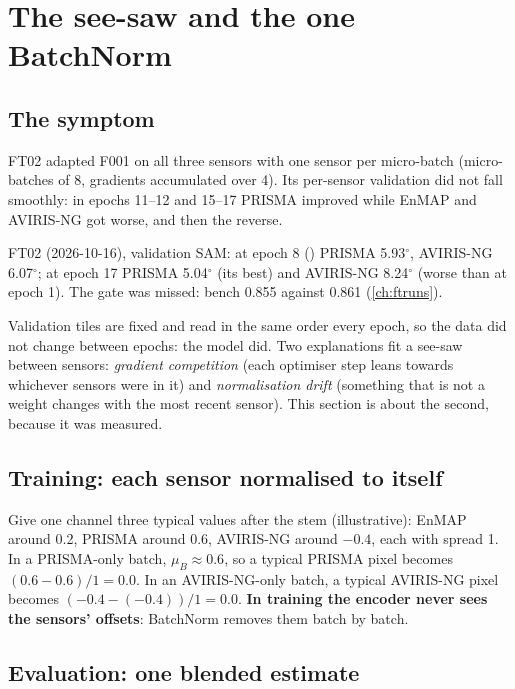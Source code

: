 \section{The see-saw and the one BatchNorm}\label{sec:finetune:seesaw}

\subsection{The symptom}

FT02 adapted F001 on all three sensors with one sensor per micro-batch (micro-batches of 8, gradients accumulated over 4). Its per-sensor validation did
not fall smoothly: in epochs 11--12 and 15--17 PRISMA improved while EnMAP and AVIRIS-NG got worse, and then the reverse.

\begin{drift}
FT02 (2026-10-16), validation SAM: at epoch 8 () PRISMA 5.93$^\circ$, AVIRIS-NG 6.07$^\circ$; at epoch 17 PRISMA 5.04$^\circ$ (its best) and
AVIRIS-NG 8.24$^\circ$ (worse than at epoch 1).\tbrk{} The gate was missed: bench 0.855
against 0.861 (\cref{ch:ftruns}).
\end{drift}

Validation tiles are fixed and read in the same order every epoch, so the data did not change between epochs: the model did. Two explanations fit a
see-saw between sensors: \emph{gradient competition} (each optimiser step leans towards whichever sensors were in it) and \emph{normalisation drift}
(something that is not a weight changes with the most recent sensor). This section is about the second, because it was measured.

\subsection{Training: each sensor normalised to itself}

Give one channel three typical values after the stem (illustrative\tbrk\tagA): EnMAP around 0.2, PRISMA around 0.6, AVIRIS-NG around $-0.4$, each with spread 1.
In a PRISMA-only batch, $\mu_B \approx 0.6$, so a typical PRISMA pixel becomes $(0.6 - 0.6)/1 = 0.0$. In an AVIRIS-NG-only batch, a typical AVIRIS-NG pixel
becomes $(-0.4 - (-0.4))/1 = 0.0$. \textbf{In training the encoder never sees the sensors' offsets}: BatchNorm removes them batch by batch.

\subsection{Evaluation: one blended estimate}

